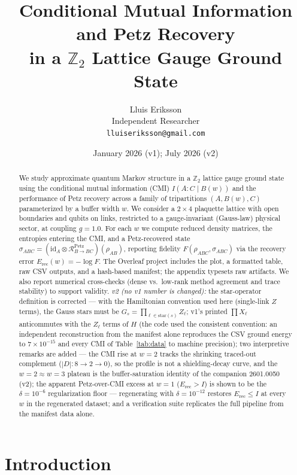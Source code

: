 \documentclass[11pt]{article}
\title{Conditional Mutual Information and Petz Recovery\\
in a $\mathbb{Z}_2$ Lattice Gauge Ground State}
\author{Lluis Eriksson\\
\small Independent Researcher\\
\small \texttt{lluiseriksson@gmail.com}}
\date{January 2026 (v1); July 2026 (v2)}
\begin{document}
\maketitle

\begin{abstract}
We study approximate quantum Markov structure in a $\mathbb{Z}_2$
lattice gauge ground state using the conditional mutual information
(CMI) $I(A : C \mid B(w))$ and the performance of Petz recovery across a
family of tripartitions $(A, B(w), C)$ parameterized by a buffer width
$w$. We consider a $2\times4$ plaquette lattice with open boundaries and
qubits on links, restricted to a gauge-invariant (Gauss-law) physical
sector, at coupling $g = 1.0$. For each $w$ we compute reduced density
matrices, the entropies entering the CMI, and a Petz-recovered state
$\sigma_{ABC} = (\mathrm{id}_A \otimes
\mathcal{R}^{\mathrm{Petz}}_{B\to BC})(\rho_{AB})$, reporting fidelity
$F(\rho_{ABC}, \sigma_{ABC})$ via the recovery error $E_{\mathrm{rec}}(w)
= -\log F$. The Overleaf project includes the plot, a formatted table,
raw CSV outputs, and a hash-based manifest; the appendix typesets raw
artifacts. We also report numerical cross-checks (dense vs.\ low-rank
method agreement and trace stability) to support validity. \emph{v2 (no
v1 number is changed):} the star-operator definition is corrected ---
with the Hamiltonian convention used here (single-link $Z$ terms), the
Gauss stars must be $G_s = \prod_{\ell \in \mathrm{star}(s)} Z_\ell$;
v1's printed $\prod X_\ell$ anticommutes with the $Z_\ell$ terms of $H$
(the code used the consistent convention: an independent reconstruction
from the manifest alone reproduces the CSV ground energy to $7\times
10^{-15}$ and every CMI of Table~\ref{tab:data} to machine precision);
two interpretive remarks are added --- the CMI rise at $w = 2$ tracks the
shrinking traced-out complement ($|D|: 8 \to 2 \to 0$), so the profile
is not a shielding-decay curve, and the $w = 2 \approx w = 3$ plateau is
the buffer-saturation identity of the companion 2601.0050 (v2); the
apparent Petz-over-CMI excess at $w = 1$ ($E_{\mathrm{rec}} > I$) is
shown to be the $\delta = 10^{-6}$ regularization floor --- regenerating
with $\delta = 10^{-12}$ restores $E_{\mathrm{rec}} \le I$ at every $w$
in the regenerated dataset; and a verification suite replicates the full
pipeline from the manifest data alone.
\end{abstract}

\section{Introduction}
\end{document}
